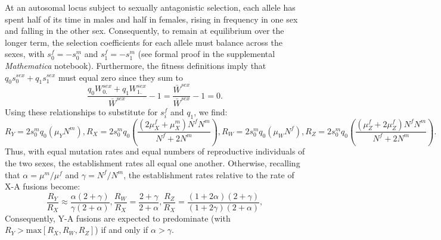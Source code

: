 At an autosomal locus subject to sexually antagonistic selection, each allele has spent half of its time in males and half in females, rising in frequency in one sex and falling in the other sex. Consequently, to remain at equilibrium over the longer term, the selection coefficients for each allele must balance across the sexes, with $s^f_0 = -s^m_0$ and $s^f_\text{1} = -s^m_\text{1}$ (see formal proof in the supplemental \emph{Mathematica} notebook). Furthermore, the fitness definitions imply that $q_0s^{sex}_0 + q_\text{1}s^{sex}_\text{1}$ must equal zero since they sum to
\[\frac{q_0W^{sex}_{0.} + q_\text{1}W^{sex}_{\text{1}.}}{\bar{W}^{sex}} - \text{1} = \frac{\bar{W}^{sex}}{\bar{W}^{sex}} - \text{1} = 0.\]
Using these relationships to substitute for $s^f_i$ and $q_\text{1}$, we find:
\begin{subequations}
\begin{equation}
R_Y = \text{2}s^m_0 q_0 (\mu_YN^m),
\end{equation}
\begin{equation}
R_X = \text{2}s^m_0 q_0 \left(\frac{(\text{2}\mu^f_X + \mu^m_X)N^fN^m}{N^f + \text{2}N^m} \right),
\end{equation}
\begin{equation}
R_W = \text{2}s^m_0 q_0 (\mu_WN^f),
\end{equation}
\begin{equation}
R_Z = \text{2}s^m_0 q_0 \left(\frac{(\mu^f_Z + \text{2}\mu^f_Z)N^fN^m}{N^f + \text{2}N^m} \right).
\end{equation}
\end{subequations}
Thus, with equal mutation rates and equal numbers of reproductive individuals of the two sexes, the establishment rates all equal one another. Otherwise, recalling that $\alpha = \mu^m/\mu^f$ and $\gamma = N^f / N^m$, the establishment rates relative to the rate of X-A fusions become:
\begin{subequations}
\begin{equation}
\frac{R_Y}{R_X} \approx \frac{\alpha(\text{2} + \gamma)}{\gamma(\text{2} + \alpha)},
\end{equation}
\begin{equation}
\frac{R_W}{R_X} = \frac{\text{2} + \gamma}{\text{2} + \alpha},
\end{equation}
\begin{equation}
\frac{R_Z}{R_X} = \frac{(\text{1} + \text{2}\alpha)(\text{2} + \gamma)}{(\text{1} + \text{2}\gamma)(\text{2} + \alpha)},
\end{equation}
\end{subequations}
Consequently, Y-A fusions are expected to predominate (with $R_Y>\text{max}[R_X,R_W,R_Z]$) if and only if $\alpha > \gamma$.


